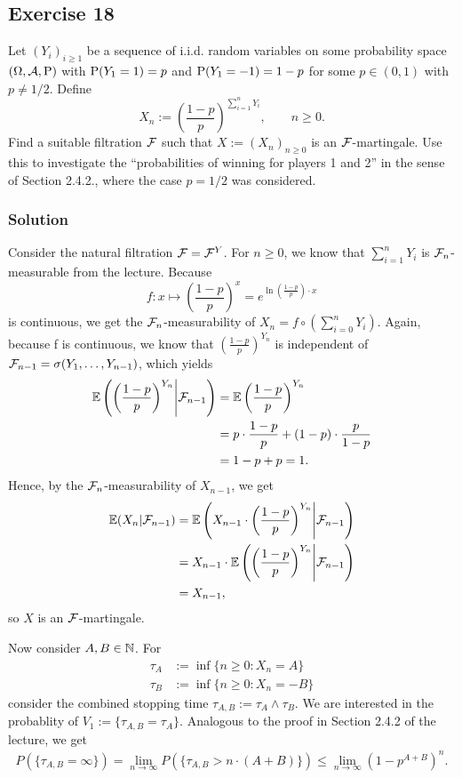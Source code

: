 \documentclass[12pt]{scrartcl}
\begin{document}
\ausruecken

\subsection*{Exercise 18}

Let $(Y_i)_{i\ge 1}$ be a sequence of i.i.d. random variables on some probability space $(\Omega,\mathcal{A},\text{P})$ with $\text{P}(Y_1=1)=p$ and $\text{P}(Y_1=-1)=1-p$ for some $p\in (0,1)$ with $p\ne 1/2$.
Define
$$X_n:=\left(\frac{1-p}{p}\right)^{\sum_{i=1}^n Y_i},\qquad n\ge 0.$$
Find a suitable filtration $\mathcal{F}$ such that $X:=(X_n)_{n\ge 0}$ is an $\mathcal{F}$-martingale. Use this to investigate the ``probabilities of winning for players 1 and 2'' in the sense of Section 2.4.2., where the case $p=1/2$ was considered.

\subsubsection*{Solution}
\einruecken

Consider the natural filtration $\mathcal{F} = \mathcal{F}^{Y}$. For $n\ge 0$, we know that $\sum_{i=1}^n Y_i$ is $\mathcal{F}_n$-measurable from the lecture. Because
$$f:x\mapsto \left(\frac{1-p}{p}\right)^x=e^{\ln\left(\frac{1-p}{p}\right)\cdot x}$$
is continuous, we get the $\mathcal{F}_n$-measurability of $X_n = f\circ (\sum_{i=0}^n Y_i)$.
Again, because f is continuous, we know that $\left(\frac{1-p}{p}\right)^{Y_n}$ is independent of $\mathcal{F}_{n-1}=\sigma(Y_1,\dots,Y_{n-1})$, which yields
\begin{align*}
\mathbb{E}\left(\left(\frac{1-p}{p}\right)^{Y_n}\middle|\mathcal{F}_{n-1}\right)
&= \mathbb{E}\left(\frac{1-p}{p}\right)^{Y_n} \\
&= p\cdot\frac{1-p}{p}+(1-p)\cdot\frac{p}{1-p} \\
&= 1-p+p=1.
\end{align*}
Hence, by the $\mathcal{F}_n$-measurability of $X_{n-1}$, we get 
\begin{align*}
\mathbb{E}(X_n|\mathcal{F}_{n-1})
&= \mathbb{E}\left(X_{n-1}\cdot\left(\frac{1-p}{p}\right)^{Y_n}\middle|\mathcal{F}_{n-1}\right) \\
&= X_{n-1}\cdot\mathbb{E}\left(\left(\frac{1-p}{p}\right)^{Y_n}\middle|\mathcal{F}_{n-1}\right) \\
&= X_{n-1},
\end{align*}
so $X$ is an $\mathcal{F}$-martingale.

Now consider $A,B\in\mathbb{N}$. For
\begin{align*}
\tau_A &:= \inf\{n\ge 0: X_n=A\} \\
\tau_B &:= \inf\{n\ge 0: X_n=-B\}
\end{align*}
consider the combined stopping time $\tau_{A,B}:=\tau_A\land\tau_B$. We are interested in the probablity of $V_1:=\{\tau_{A,B}=\tau_A\}$.
Analogous to the proof in Section 2.4.2 of the lecture, we get
\begin{align*}
P(\{\tau_{A,B}=\infty\})
=\lim_{n\rightarrow \infty}P(\{\tau_{A,B}>n\cdot (A+B)\})
\le\lim_{n\rightarrow \infty}(1-p^{A+B})^n.
\end{align*}
\end{document}
